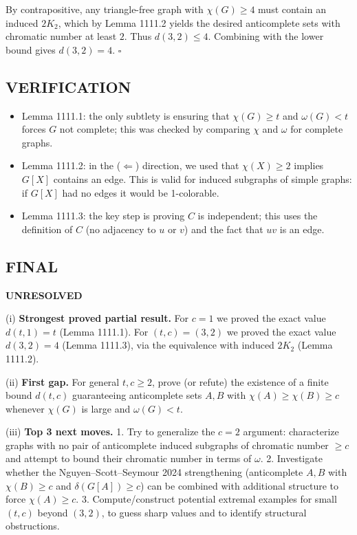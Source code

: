 By contrapositive, any triangle-free graph with $\chi(G)\ge 4$ must contain an induced $2K_2$, which by Lemma 1111.2 yields the desired anticomplete sets with chromatic number at least $2$.
Thus $d(3,2)\le 4$.
Combining with the lower bound gives $d(3,2)=4$. \hfill $\square$

\subsection*{VERIFICATION}
\begin{itemize}
\item Lemma 1111.1: the only subtlety is ensuring that $\chi(G)\ge t$ and $\omega(G)<t$ forces $G$ not complete; this was checked by comparing $\chi$ and $\omega$ for complete graphs.
\item Lemma 1111.2: in the ($\Leftarrow$) direction, we used that $\chi(X)\ge 2$ implies $G[X]$ contains an edge. This is valid for induced subgraphs of simple graphs: if $G[X]$ had no edges it would be 1-colorable.
\item Lemma 1111.3: the key step is proving $C$ is independent; this uses the definition of $C$ (no adjacency to $u$ or $v$) and the fact that $uv$ is an edge.
\end{itemize}

\subsection*{FINAL}
\textbf{UNRESOLVED}

(i) \textbf{Strongest proved partial result.}
For $c=1$ we proved the exact value $d(t,1)=t$ (Lemma 1111.1).
For $(t,c)=(3,2)$ we proved the exact value $d(3,2)=4$ (Lemma 1111.3), via the equivalence with induced $2K_2$ (Lemma 1111.2).

(ii) \textbf{First gap.}
For general $t,c\ge 2$, prove (or refute) the existence of a finite bound $d(t,c)$ guaranteeing anticomplete sets $A,B$ with $\chi(A)\ge \chi(B)\ge c$ whenever $\chi(G)$ is large and $\omega(G)<t$.

(iii) \textbf{Top 3 next moves.}
1. Try to generalize the $c=2$ argument: characterize graphs with no pair of anticomplete induced subgraphs of chromatic number $\ge c$ and attempt to bound their chromatic number in terms of $\omega$.
2. Investigate whether the Nguyen--Scott--Seymour 2024 strengthening (anticomplete $A,B$ with $\chi(B)\ge c$ and $\delta(G[A])\ge c$) can be combined with additional structure to force $\chi(A)\ge c$.
3. Compute/construct potential extremal examples for small $(t,c)$ beyond $(3,2)$, to guess sharp values and to identify structural obstructions.

